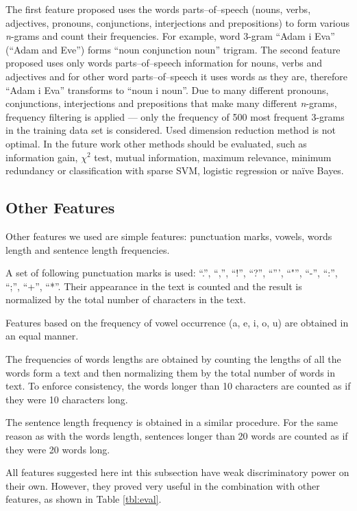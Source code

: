 \documentclass{llncs}
\begin{document}
The first feature proposed uses the words parts--of--speech
(nouns, verbs, adjectives, pronouns, conjunctions, interjections and
prepositions) to form various \emph{n}-grams and count their frequencies. For
example, word 3-gram ``Adam i Eva'' (``Adam and Eve'') forms ``noun
conjunction noun'' trigram. The second feature proposed uses only words
parts--of--speech information for nouns, verbs and adjectives and for other word
parts--of--speech it uses words as they are, therefore ``Adam i Eva'' transforms
to ``noun i noun''. Due to many different pronouns, conjunctions, interjections
and prepositions that make many different \emph{n}-grams, frequency filtering
is applied --- only the frequency of 500 most frequent 3-grams in the
training data set is considered. Used dimension reduction method is not optimal.
In the future work other methods should be evaluated, such as information
gain, $\chi^2$ test, mutual information, maximum relevance, minimum redundancy
or classification with sparse SVM, logistic regression or na\"ive Bayes.

\subsection{Other Features}
\label{sec:znacajke-manje}
Other features we used are simple features: punctuation marks, vowels, words
length and sentence length frequencies.

A set of following punctuation marks is used: ``.'', ``,'', ``!'', ``?'',
``''', ``"'', ``-'', ``:'', ``;'', ``+'', ``*''. Their appearance in the text is counted and
the result is normalized by the total number of characters in the text. 

Features based on the frequency of vowel occurrence (a, e, i, o, u) are
obtained in an equal manner.

The frequencies of words lengths are obtained by counting the lengths of all
the words form a text and then normalizing them by the total number of words in
text. To enforce consistency, the words longer than 10 characters are counted as
if they were 10 characters long.

The sentence length frequency is obtained in a similar procedure.
For the same reason as with the words length, sentences longer than 20 words are
counted as if they were 20 words long.

All features suggested here int this subsection have weak discriminatory power
on their own. However, they proved very useful in the combination with other features, as
shown in Table \ref{tbl:eval}.
\end{document}
